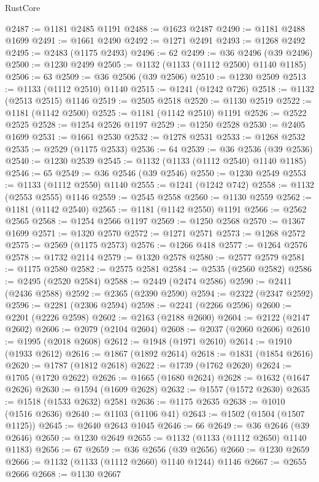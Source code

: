 \begin{lexlean}{RustCore}
\begin{coremodule}
@2487 := @1181 @2485 @1191
@2488 := @1623 @2487
@2490 := @1181 @2488 @1699
@2491 := @1661 @2490
@2492 := @1271 @2491
@2493 := @1268 @2492
@2495 := @2483 (@1175 @2493)
@2496 := 62
@2499 := @36 @2496 (@39 @2496)
@2500 := @1230 @2499
@2505 := @1132 (@1133 (@1112 @2500) @1140 @1185)
@2506 := 63
@2509 := @36 @2506 (@39 @2506)
@2510 := @1230 @2509
@2513 := @1133 (@1112 @2510) @1140
@2515 := @1241 (@1242 @726)
@2518 := @1132 (@2513 @2515) @1146
@2519 := @2505 @2518
@2520 := @1130 @2519
@2522 := @1181 (@1142 @2500)
@2525 := @1181 (@1142 @2510) @1191
@2526 := @2522 @2525
@2528 := @1254 @2526 @1197
@2529 := @1250 @2528
@2530 := @2405 @1699
@2531 := @1661 @2530
@2532 := @1278 @2531
@2533 := @1268 @2532
@2535 := @2529 (@1175 @2533)
@2536 := 64
@2539 := @36 @2536 (@39 @2536)
@2540 := @1230 @2539
@2545 := @1132 (@1133 (@1112 @2540) @1140 @1185)
@2546 := 65
@2549 := @36 @2546 (@39 @2546)
@2550 := @1230 @2549
@2553 := @1133 (@1112 @2550) @1140
@2555 := @1241 (@1242 @742)
@2558 := @1132 (@2553 @2555) @1146
@2559 := @2545 @2558
@2560 := @1130 @2559
@2562 := @1181 (@1142 @2540)
@2565 := @1181 (@1142 @2550) @1191
@2566 := @2562 @2565
@2568 := @1254 @2566 @1197
@2569 := @1250 @2568
@2570 := @1367 @1699
@2571 := @1320 @2570
@2572 := @1271 @2571
@2573 := @1268 @2572
@2575 := @2569 (@1175 @2573)
@2576 := @1266 @418
@2577 := @1264 @2576
@2578 := @1732 @2114
@2579 := @1320 @2578
@2580 := @2577 @2579
@2581 := @1175 @2580
@2582 := @2575 @2581
@2584 := @2535 (@2560 @2582)
@2586 := @2495 (@2520 @2584)
@2588 := @2449 (@2474 @2586)
@2590 := @2411 (@2436 @2588)
@2592 := @2365 (@2390 @2590)
@2594 := @2322 (@2347 @2592)
@2596 := @2281 (@2306 @2594)
@2598 := @2241 (@2266 @2596)
@2600 := @2201 (@2226 @2598)
@2602 := @2163 (@2188 @2600)
@2604 := @2122 (@2147 @2602)
@2606 := @2079 (@2104 @2604)
@2608 := @2037 (@2060 @2606)
@2610 := @1995 (@2018 @2608)
@2612 := @1948 (@1971 @2610)
@2614 := @1910 (@1933 @2612)
@2616 := @1867 (@1892 @2614)
@2618 := @1831 (@1854 @2616)
@2620 := @1787 (@1812 @2618)
@2622 := @1739 (@1762 @2620)
@2624 := @1705 (@1720 @2622)
@2626 := @1665 (@1680 @2624)
@2628 := @1632 (@1647 @2626)
@2630 := @1594 (@1609 @2628)
@2632 := @1557 (@1572 @2630)
@2635 := @1518 (@1533 @2632) @2581
@2636 := @1175 @2635
@2638 := @1010 (@1516 @2636)
@2640 := @1103 (@1106 @41)
@2643 := @1502 (@1504 (@1507 @1125))
@2645 := @2640 @2643 @1045
@2646 := 66
@2649 := @36 @2646 (@39 @2646)
@2650 := @1230 @2649
@2655 := @1132 (@1133 (@1112 @2650) @1140 @1183)
@2656 := 67
@2659 := @36 @2656 (@39 @2656)
@2660 := @1230 @2659
@2666 := @1132 (@1133 (@1112 @2660) @1140 @1244) @1146
@2667 := @2655 @2666
@2668 := @1130 @2667

\end{coremodule}
\end{lexlean}
